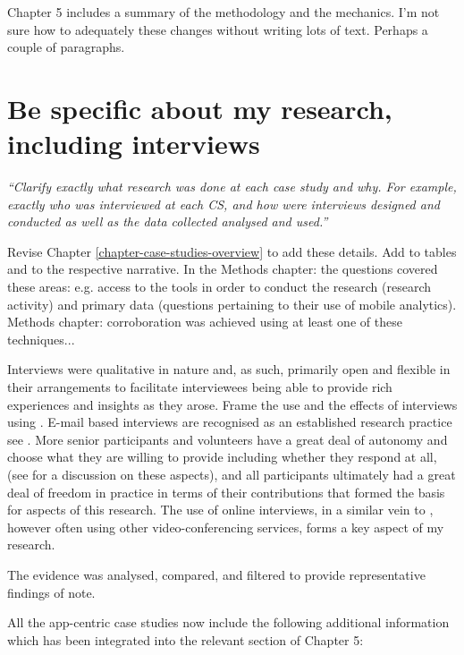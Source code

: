 Chapter 5 includes a summary of the methodology and the mechanics. I'm not sure how to adequately these changes without writing lots of text. Perhaps a couple of paragraphs.

\section{Be specific about my research, including interviews}
\emph{``Clarify exactly what research was done at each case study and why. For example, exactly who was interviewed at each CS, and how were interviews designed and conducted as well as the data collected analysed and used.''}

Revise Chapter \ref{chapter-case-studies-overview} to add these details. Add to tables and to the respective narrative. In the Methods chapter: the questions covered these areas: e.g. access to the tools in order to conduct the research (research activity) and primary data (questions pertaining to their use  of mobile analytics). Methods chapter: corroboration was achieved using at least one of these techniques...

Interviews were qualitative in nature and, as such, primarily open and flexible in their arrangements to facilitate interviewees being able to provide rich experiences and insights as they arose. Frame the use and the effects of interviews using . E-mail based interviews are recognised as an established research practice see . More senior participants and volunteers have a great deal of autonomy and choose what they are willing to provide including whether they respond at all, (see  for a discussion on these aspects), and all participants ultimately had a great deal of freedom in practice in terms of their contributions that formed the basis for aspects of this research. The use of online interviews, in a similar vein to , however often using other video-conferencing services, forms a key aspect of my research.

The evidence was analysed, compared, and filtered to provide representative findings of note. 



All the app-centric case studies now include the following additional information which has been integrated into the relevant section of Chapter 5:

